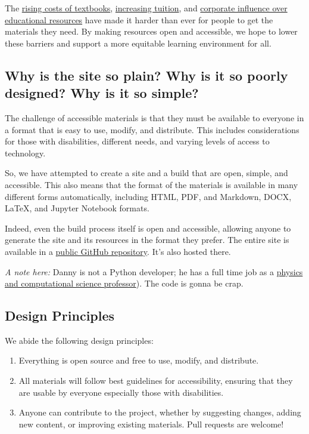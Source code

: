 The
\href{https://educationdata.org/average-cost-of-college-textbooks}{rising
costs of textbooks},
\href{https://educationdata.org/college-tuition-inflation-rate}{increasing
tuition}, and
\href{https://www.brookings.edu/articles/increasing-the-impact-of-corporate-engagement-in-education-landscape-and-challenges/}{corporate
influence over educational resources} have made it harder than ever for
people to get the materials they need. By making resources open and
accessible, we hope to lower these barriers and support a more equitable
learning environment for all.

\subsection{Why is the site so plain? Why is it so poorly designed? Why
is it so
simple?}\label{why-is-the-site-so-plain-why-is-it-so-poorly-designed-why-is-it-so-simple}

The challenge of accessible materials is that they must be available to
everyone in a format that is easy to use, modify, and distribute. This
includes considerations for those with disabilities, different needs,
and varying levels of access to technology.

So, we have attempted to create a site and a build that are open,
simple, and accessible. This also means that the format of the materials
is available in many different forms automatically, including HTML, PDF,
and Markdown, DOCX, LaTeX, and Jupyter Notebook formats.

Indeed, even the build process itself is open and accessible, allowing
anyone to generate the site and its resources in the format they prefer.
The entire site is available in a
\href{https://github.com/dannycab/modern-classical-mechanics}{public
GitHub repository}. It's also hosted there.

\emph{A note here:} Danny is not a Python developer; he has a full time
job as a \href{https://dannycab.github.io/}{physics and computational
science professor}). The code is gonna be crap.

\subsection{Design Principles}\label{design-principles}

We abide the following design principles:

\begin{enumerate}
\def\labelenumi{\arabic{enumi}.}
\tightlist
\item
  Everything is open source and free to use, modify, and distribute.
\item
  All materials will follow best guidelines for accessibility, ensuring
  that they are usable by everyone especially those with disabilities.
\item
  Anyone can contribute to the project, whether by suggesting changes,
  adding new content, or improving existing materials. Pull requests are
  welcome!
\end{enumerate}

